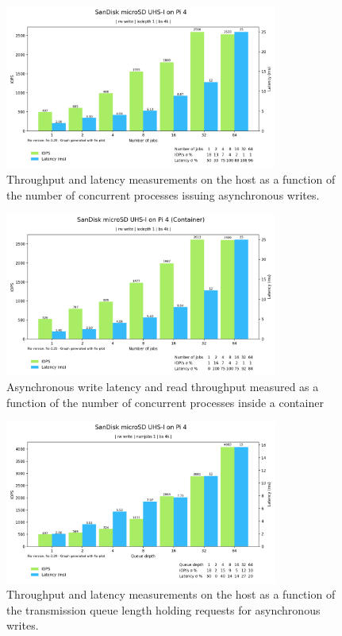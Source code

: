 \begin{figure}[H]
    \centering
    \includegraphics[width=0.8\textwidth]{images/results/sandisk-host-libaio-write-numjobs-iops-latency.png}
    \caption{Throughput and latency measurements on the host as a function of the number of concurrent processes issuing asynchronous writes.}
    \label{images:fundamentals/net-ns-veth-arch.jpg}
\end{figure}

\begin{figure}[H]
    \centering
    \includegraphics[width=0.8\textwidth]{images/results/sandisk-libaio-write-num-jobs-iops-latency.png}
    \caption{Asynchronous write latency and read throughput measured as a function of the number of concurrent processes inside a container}
    \label{images:fundamentals/net-ns-veth-arch.jpg}
\end{figure}

\begin{figure}[H]
    \centering
    \includegraphics[width=0.8\textwidth]{images/results/sandisk-host-libaio-write-queue-depth-iops-latency.png}
    \caption{Throughput and latency measurements on the host as a function of the transmission queue length holding requests for asynchronous writes.}
    \label{images:fundamentals/net-ns-veth-arch.jpg}
\end{figure}

